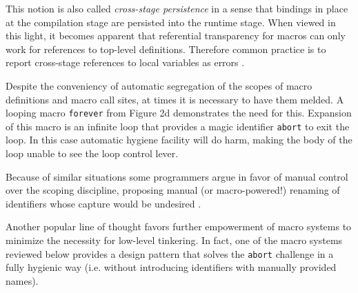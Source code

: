 \documentclass[10pt,journal,a4paper]{IEEEtran}
\begin{document}
This notion is also called \emph{cross-stage persistence} in a sense that bindings in place
at the compilation stage are persisted into the runtime stage. When viewed in this light,
it becomes apparent that referential transparency for macros can only work for references
to top-level definitions. Therefore common practice is to report cross-stage references to local variables
as errors \cite{dybvig92}.

Despite the conveniency of automatic segregation of the scopes of macro definitions and macro call sites,
at times it is necessary to have them melded.
A looping macro \texttt{forever} from Figure 2d demonstrates the need for this. Expansion of this macro
is an infinite loop that provides a magic identifier \texttt{abort} to exit the loop.
In this case automatic hygiene facility will do harm, making the body of the loop unable to see
the loop control lever.

Because of similar situations some programmers argue in favor of manual control over
the scoping discipline, proposing manual (or macro-powered!) renaming of identifiers whose capture would be
undesired \cite{clinger91,hoyte08}.

Another popular line of thought favors further empowerment of macro systems
to minimize the necessity for low-level tinkering.
In fact, one of the macro systems reviewed below provides a design pattern \cite{barzilay11}
that solves the \texttt{abort} challenge in a fully hygienic way (i.e. without introducing
identifiers with manually provided names).
\end{document}
